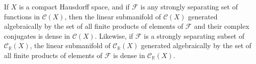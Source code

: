 If $X$ is a compact Hausdorff space, and if $\mathcal{F}$ is any strongly separating set of functions in $\mathcal{C}(X)$, then the linear submanifold of $\mathcal{C}(X)$ generated algebraically by the set of all finite products of elements of $\mathcal{F}$ and their complex conjugates is dense in $\mathcal{C}(X)$. Likewise, if $\mathcal{F}$ is a strongly separating subset of $\mathcal{C}_{\mathbb{R}}(X)$, the linear submanifold of $\mathcal{C}_{\mathbb{R}}(X)$ generated algebraically by the set of all finite products of elements of $\mathcal{F}$ is dense in $\mathcal{C}_{\mathbb{R}}(X)$.
